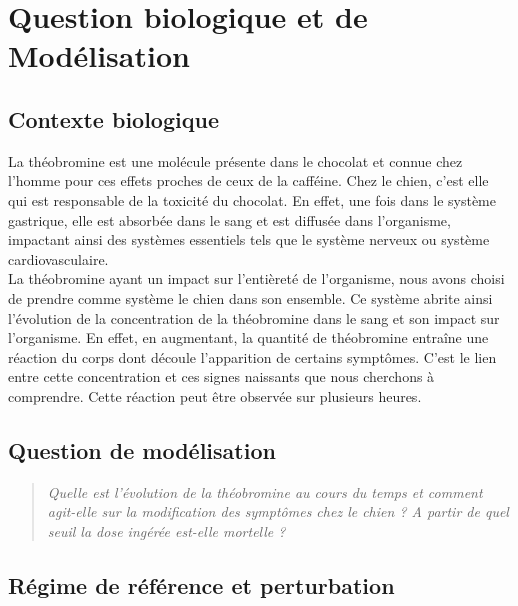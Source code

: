 \documentclass[11pt,a4paper]{article}
\begin{document}

\section{Question biologique et de Modélisation}
\label{sec:question}


\subsection{Contexte biologique}


La théobromine est une molécule présente dans le chocolat et connue chez l'homme pour ces effets
proches de ceux de la cafféine. Chez le chien, c'est elle qui est responsable de la toxicité du chocolat. En effet, 
une fois dans le système gastrique, elle est absorbée dans le sang et est diffusée dans l'organisme,
impactant ainsi des systèmes essentiels tels que le système nerveux ou système cardiovasculaire. \\
La théobromine ayant un impact sur l'entièreté de l'organisme, nous avons choisi de prendre 
comme système le chien dans son ensemble. Ce système abrite ainsi l'évolution de la concentration
de la théobromine dans le sang et son impact sur l'organisme. En effet, en augmentant, la quantité
de théobromine entraîne une réaction du corps dont découle l'apparition de certains symptômes.
C'est le lien entre cette concentration et ces signes naissants que nous cherchons à comprendre. 
Cette réaction peut être observée sur plusieurs heures. 
\\



\subsection{Question de modélisation}



\begin{quote}
\itshape
Quelle est l'évolution de la théobromine au cours du temps et comment agit-elle sur la modification
des symptômes chez le chien ? A partir de quel seuil la dose ingérée est-elle mortelle ? 
\end{quote}


\subsection{Régime de référence et perturbation}
\end{document}
